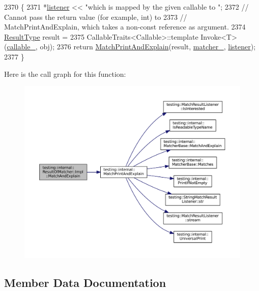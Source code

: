 \begin{DoxyCode}
2370                                                                              \{
2371       *\hyperlink{namespaceinteractive__marker_a0e579ab555212bb5e2c9f8a675b7618a}{listener} << \textcolor{stringliteral}{"which is mapped by the given callable to "};
2372       \textcolor{comment}{// Cannot pass the return value (for example, int) to}
2373       \textcolor{comment}{// MatchPrintAndExplain, which takes a non-const reference as argument.}
2374       \hyperlink{classtesting_1_1internal_1_1ResultOfMatcher_aa9db2267792fcae2cfa3f57683f4e048}{ResultType} result =
2375           CallableTraits<Callable>::template Invoke<T>(\hyperlink{classtesting_1_1internal_1_1ResultOfMatcher_1_1Impl_a4020b7c533f4cb147abd5af081308e37}{callable\_}, obj);
2376       \textcolor{keywordflow}{return} \hyperlink{namespacetesting_1_1internal_a0821df2611d54c79bac990719ad8a2dd}{MatchPrintAndExplain}(result, \hyperlink{classtesting_1_1internal_1_1ResultOfMatcher_1_1Impl_a2ce504e44dae05b5e574e21def4f1cba}{matcher\_}, 
      \hyperlink{namespaceinteractive__marker_a0e579ab555212bb5e2c9f8a675b7618a}{listener});
2377     \}
\end{DoxyCode}
Here is the call graph for this function\+:
\nopagebreak
\begin{figure}[H]
\begin{center}
\leavevmode
\includegraphics[width=350pt]{classtesting_1_1internal_1_1ResultOfMatcher_1_1Impl_a4f9d7dfdad8ad8f1ab4f5ffe11c26763_cgraph}
\end{center}
\end{figure}


\subsection{Member Data Documentation}
\mbox{\label{classtesting_1_1internal_1_1ResultOfMatcher_1_1Impl_a4020b7c533f4cb147abd5af081308e37}} 
